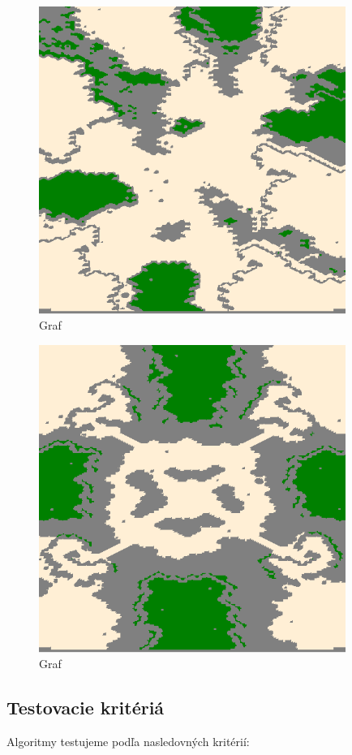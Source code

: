 \begin{figure}[h]
\centering
\includegraphics[width=10cm]{./img/Aftershock.png}
\caption{Graf }
\label{fig:aftershock_map}
\end{figure}
\begin{figure}[h]
\centering
\includegraphics[width=10cm]{./img/Brushfire.png}
\caption{Graf }
\label{fig:brushfire_map}
\end{figure}
\subsection{Testovacie kritériá}
Algoritmy testujeme podľa nasledovných kritérií:

